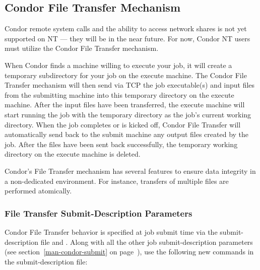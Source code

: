 \subsection{\label{sec:File-Transfer}Condor File Transfer Mechanism}

Condor remote system calls and the ability to access network shares is not
yet supported on NT --- they will be in the near future.  For now, Condor NT 
users must utilize the Condor File Transfer mechanism.  

When Condor finds a machine willing to execute your job, it will create a
temporary subdirectory for your job on the execute machine.
The Condor File Transfer mechanism will then send via TCP the job
executable(s) and input files from the submitting machine into this
temporary directory on the execute machine.
After the input files have been transferred, the execute machine will start
running the job with the temporary directory as the job's current working
directory.
When the job completes or is kicked off, Condor File Transfer will
automatically send back to the submit machine any output files created by
the job.  After the files have been sent back successfully, the temporary
working directory on the execute machine is deleted.

Condor's File Transfer mechanism has several features to ensure data
integrity in a non-dedicated environment.  For instance, transfers of
multiple files are performed atomically.

\subsubsection{File Transfer Submit-Description Parameters}
Condor File Transfer behavior is specified at job submit time via the
submit-description file and .  Along with all the other job
submit-description parameters (see section~\ref{man-condor-submit} on
page~\pageref{man-condor-submit}), use the following new commands in
the submit-description file:

